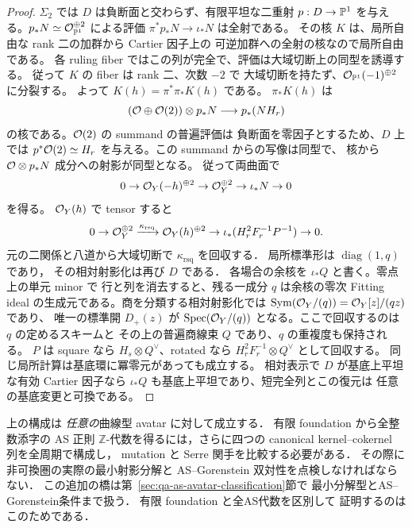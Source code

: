 \begin{proof}
$\Sigma_2$ では $D$ は負断面と交わらず、有限平坦な二重射
$p:D\to\mathbb P^1$ を与える。$p_*N\simeq\mathcal O_{\mathbb P^1}^{\oplus2}$
による評価 $\pi^*p_*N\to\iota_*N$ は全射である。
その核 $K$ は、局所自由な rank 二の加群から Cartier 因子上の
可逆加群への全射の核なので局所自由である。
各 ruling fiber ではこの列が完全で、評価は大域切断上の同型を誘導する。
従って $K$ の fiber は rank 二、次数 $-2$ で
大域切断を持たず、$\mathcal O_{\mathbb P^1}(-1)^{\oplus2}$ に分裂する。
よって $K(h)=\pi^*\pi_*K(h)$ である。
$\pi_*K(h)$ は
\[
 (\mathcal O\oplus\mathcal O(2))\otimes p_*N\longrightarrow p_*(NH_r)
\]
の核である。$\mathcal O(2)$ の summand の普遍評価は
負断面を零因子とするため、$D$ 上では
$p^*\mathcal O(2)\simeq H_r$ を与える。この summand からの写像は同型で、
核から $\mathcal O\otimes p_*N$ 成分への射影が同型となる。
従って両曲面で
\[
0\to\mathcal O_Y(-h)^{\oplus2}\to\mathcal O_Y^{\oplus2}
  \to\iota_*N\to0
\]
を得る。
$\mathcal O_Y(h)$ で tensor すると
\begin{equation}
0\to\mathcal O_Y^{\oplus2}
 \xrightarrow{\kappa_{\mathrm{rsq}}}
 \mathcal O_Y(h)^{\oplus2}
 \to\iota_*(H_r^2F_r^{-1}P^{-1})\to0 .
\label{eq:qa-core-rotated-matrix}
\end{equation}
元の二関係と八道から大域切断で
$\kappa_{\mathrm{rsq}}$ を回収する．
局所標準形は $\operatorname{diag}(1,q)$ であり，
その相対射影化は再び $D$ である．
各場合の余核を $\iota_*Q$ と書く。零点上の単元 minor で
行と列を消去すると、残る一成分 $q$ は余核の零次
Fitting ideal の生成元である。商を分類する相対射影化では
$\operatorname{Sym}(\mathcal O_Y/(q))=\mathcal O_Y[z]/(qz)$ であり、
唯一の標準開 $D_+(z)$ が $\operatorname{Spec}(\mathcal O_Y/(q))$
となる。ここで回収するのは $q$ の定めるスキームと
その上の普遍商線束 $Q$ であり、$q$ の重複度も保持される。
$P$ は square なら $H_s\otimes Q^\vee$、rotated なら
$H_r^2F_r^{-1}\otimes Q^\vee$ として回収する。
同じ局所計算は基底環に冪零元があっても成立する。
相対表示で $D$ が基底上平坦な有効 Cartier 因子なら
$\iota_*Q$ も基底上平坦であり、短完全列とこの復元は
任意の基底変更と可換である。
\end{proof}

\begin{remark}
\label{rem:qa-core-as-scope}
上の構成は \emph{任意の}曲線型 avatar に対して成立する．
有限 foundation から全整数添字の AS 正則
$\mathbb Z$-代数を得るには，さらに四つの canonical
kernel--cokernel 列を全周期で構成し，
mutation と Serre 関手を比較する必要がある．
その際に非可換圏の実際の最小射影分解と
AS--Gorenstein 双対性を点検しなければならない．
この追加の橋は第~\ref{sec:qa-as-avatar-classification}節で
最小分解型とAS--Gorenstein条件まで扱う．
有限 foundation と全AS代数を区別して
証明するのはこのためである．
\end{remark}
